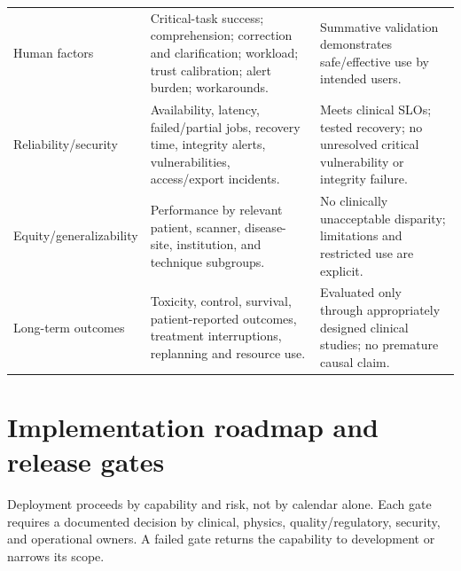 \documentclass[11pt,letterpaper]{article}
\begin{document}
\begin{small}
\begin{longtable}{@{}L{0.1474\textwidth}L{0.4688\textwidth}L{0.3037\textwidth}@{}}
\addlinespace[2pt]
Human factors & Critical-task success; comprehension; correction and clarification; workload; trust calibration; alert burden; workarounds. & Summative validation demonstrates safe\slash\allowbreak{}effective use by intended users. \\
\addlinespace[2pt]
Reliability\slash\allowbreak{}security & Availability, latency, failed\slash\allowbreak{}partial jobs, recovery time, integrity alerts, vulnerabilities, access\slash\allowbreak{}export incidents. & Meets clinical SLOs; tested recovery; no unresolved critical vulnerability or integrity failure. \\
\addlinespace[2pt]
Equity\slash\allowbreak{}generalizability & Performance by relevant patient, scanner, disease-site, institution, and technique subgroups. & No clinically unacceptable disparity; limitations and restricted use are explicit. \\
\addlinespace[2pt]
Long-term outcomes & Toxicity, control, survival, patient-reported outcomes, treatment interruptions, replanning and resource use. & Evaluated only through appropriately designed clinical studies; no premature causal claim. \\
\end{longtable}
\end{small}

\section{Implementation roadmap and release gates}

Deployment proceeds by capability and risk, not by calendar alone. Each gate requires a documented decision by clinical, physics, quality\slash\allowbreak{}regulatory, security, and operational owners. A failed gate returns the capability to development or narrows its scope.
\end{document}
